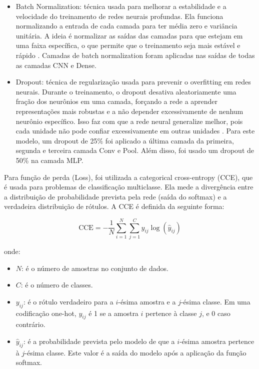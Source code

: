 \documentclass[]{abntex2}
\begin{document}
\begin{itemize}
    \item Batch Normalization: técnica usada para melhorar a estabilidade e a velocidade do treinamento de redes neurais profundas. Ela funciona normalizando a entrada de cada camada para ter média zero e variância unitária. A ideia é normalizar as saídas das camadas para que estejam em uma faixa específica, o que permite que o treinamento seja mais estável e rápido \cite{ioffe2015batch}. Camadas de batch normalization foram aplicadas nas saídas de todas as camadas CNN e Dense.
    \item Dropout: técnica de regularização usada para prevenir o overfitting em redes neurais. Durante o treinamento, o dropout desativa aleatoriamente uma fração dos neurônios em uma camada, forçando a rede a aprender representações mais robustas e a não depender excessivamente de nenhum neurônio específico. Isso faz com que a rede neural generalize melhor, pois cada unidade não pode confiar excessivamente em outras unidades \cite{srivastava2014dropout}. Para este modelo, um dropout de 25\% foi aplicado a última camada da primeira, segunda e terceira camada Conv e Pool. Além disso, foi usado um dropout de 50\% na camada MLP.
\end{itemize}

Para função de perda (Loss), foi utilizada a categorical cross-entropy (CCE), que é usada para problemas de classificação multiclasse. Ela mede a divergência entre a distribuição de probabilidade prevista pela rede (saída do softmax) e a verdadeira distribuição de rótulos. A CCE é definida da seguinte forma:

\[
\text{CCE} = -\dfrac{1}{N}\sum_{i=1}^{N} \sum_{j=1}^{C} y_{ij} \log(\hat{y}_{ij})
\]

onde:

\begin{itemize}
    \item \(N\): é o número de amostras no conjunto de dados.
    \item \(C\): é o número de classes.
    \item \(y_{ij}\): é o rótulo verdadeiro para a \(i\)-ésima amostra e a \(j\)-ésima classe. Em uma codificação one-hot, \(y_{ij}\) é 1 se a amostra \(i\) pertence à classe \(j\), e 0 caso contrário.
    \item \(\hat{y}_{ij}\): é a probabilidade prevista pelo modelo de que a \(i\)-ésima amostra pertence à \(j\)-ésima classe. Este valor é a saída do modelo após a aplicação da função softmax. 
\end{itemize}
\end{document}
